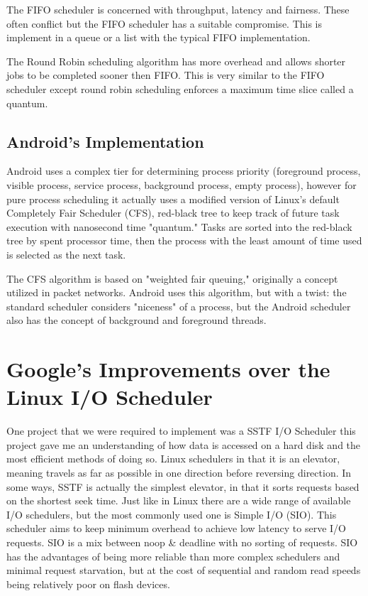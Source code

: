 \documentclass[letterpaper,10pt]{article}
\begin{document}
The FIFO scheduler is concerned with throughput, latency and fairness. These often conflict but the FIFO scheduler has a suitable compromise. This is implement in a queue or a list with the typical FIFO implementation.

The Round Robin scheduling algorithm has more overhead and allows shorter jobs to be completed sooner then FIFO. This is very similar to the FIFO scheduler except round robin scheduling enforces a maximum time slice called a quantum.

\subsection{Android's Implementation}
Android uses a complex tier for determining process priority (foreground process, visible process, service process, background process, empty process), however for pure process scheduling it actually uses a modified version of Linux's default Completely Fair Scheduler (CFS), red-black tree to keep track of future task execution with nanosecond time "quantum." Tasks are sorted into the red-black tree by spent processor time, then the process with the least amount of time used is selected as the next task.

The CFS algorithm is based on "weighted fair queuing," originally a concept utilized in packet networks. Android uses this algorithm, but with a twist: the standard scheduler considers "niceness" of
a process, but the Android scheduler also has the concept of background and foreground threads.


\section{Google's Improvements over the Linux I/O Scheduler}
One project that we were required to implement was a SSTF I/O Scheduler this project gave me an understanding of how data is accessed on a hard disk and the most efficient methods of doing so. Linux schedulers in that it is an elevator, meaning travels as far as possible in one direction before reversing direction. In some ways, SSTF is actually the simplest elevator, in that it sorts requests based on the shortest seek time. Just like in Linux there are a wide range of available I/O schedulers, but the most commonly used one is Simple I/O (SIO). This scheduler aims to keep minimum overhead to achieve low latency to serve I/O requests.  SIO is a mix between noop \& deadline with no sorting of requests. SIO has the advantages of being more reliable than more complex schedulers and minimal request starvation, but at the cost of sequential and random read speeds being relatively poor on ﬂash devices.
\end{document}
